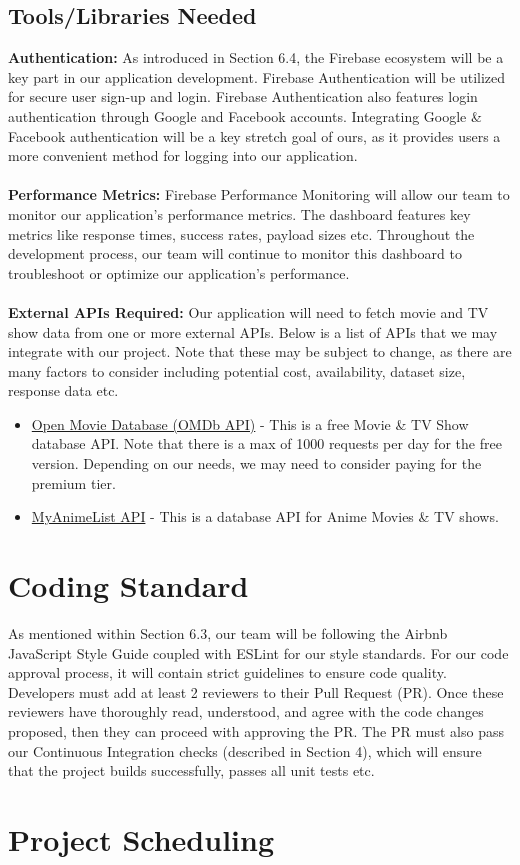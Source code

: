 \documentclass{article}
\begin{document}
\subsection{Tools/Libraries Needed}
\textbf{Authentication:}
As introduced in Section 6.4, the Firebase ecosystem will be a key part in our application development. Firebase Authentication will be utilized for secure user sign-up and login. Firebase Authentication also features login authentication through Google and Facebook accounts. Integrating Google \& Facebook authentication will be a key stretch goal of ours, as it provides users a more convenient method for logging into our application. 
\\ \\
\noindent \textbf{Performance Metrics:} 
Firebase Performance Monitoring will allow our team to monitor our application's performance metrics. The dashboard features key metrics like response times, success rates, payload sizes etc. Throughout the development process, our team will continue to monitor this dashboard to troubleshoot or optimize our application's performance. 
\\ \\
\noindent \textbf{External APIs Required:} 
Our application will need to fetch movie and TV show data from one or more external APIs. Below is a list of APIs that we may integrate with our project. Note that these may be subject to change, as there are many factors to consider including potential cost, availability, dataset size, response data etc.
\begin{itemize}
	\item \href{https://www.omdbapi.com/}{Open Movie Database (OMDb API)} - This is a free Movie \& TV Show database API. Note that there is a max of 1000 requests per day for the free version. Depending on our needs, we may need to consider paying for the premium tier.
	\item \href{https://myanimelist.net/apiconfig/references/api/v2}{MyAnimeList API} - This is a database API for Anime Movies \& TV shows.  
\end{itemize}

\section{Coding Standard}
As mentioned within Section 6.3, our team will be following the Airbnb JavaScript Style Guide coupled with ESLint for our style standards. For our code approval process, it will contain strict guidelines to ensure code quality. Developers must add at least 2 reviewers to their Pull Request (PR). Once these reviewers have thoroughly read, understood, and agree with the code changes proposed, then they can proceed with approving the PR. The PR must also pass our Continuous Integration checks (described in Section 4), which will ensure that the project builds successfully, passes all unit tests etc.

\section{Project Scheduling}

\end{document}

